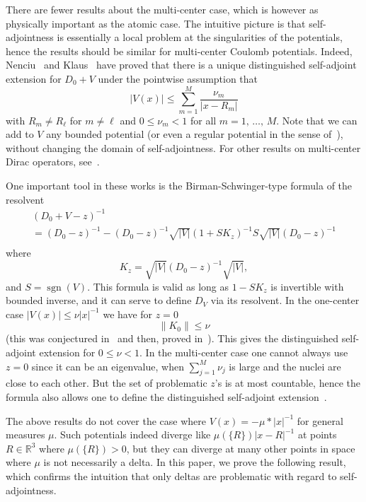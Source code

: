 \documentclass[10pt]{amsart}
\theoremstyle{definition}
\newcommand{\R}{\mathbb{R}}
\DeclareMathOperator{\sgn}{sgn}
\newcommand\1{{\ensuremath {\mathds 1} }}
\newcommand{\norm}[1]{ \left\| #1 \right\|}
\renewcommand{\leq}{\leqslant}
\begin{document}
There are fewer results about the multi-center case, which is however as physically important as the atomic case. The intuitive picture is that self-adjointness is essentially a local problem at the singularities of the potentials, hence the results should be similar for multi-center Coulomb potentials. Indeed, Nenciu~\cite{Nenciu-77} and Klaus~\cite{Klaus-80b} have proved that there is a unique distinguished self-adjoint extension for $D_0+V$ under the pointwise assumption that
\begin{equation}\label{eq:ass_V_subcritical}
\left|V(x)\right|\leq \sum_{m=1}^M\frac{\nu_m}{\left|x-R_m\right|}
\end{equation}
with $R_m\neq R_\ell$ for $m\neq \ell$ and $0\leq \nu_m<1$ for all $m=1,\,\dots,\,M$. Note that we can add to $V$ any bounded potential (or even a regular potential in the sense of~\cite{Nenciu-76,Nenciu-77}), without changing the domain of self-adjointness. For other results on multi-center Dirac operators, see~\cite{BriHog-03,Kanarski-85}.

One important tool in these works is the Birman-Schwinger-type formula of the resolvent~\cite{Klaus-80b,KlaWus-79,Nenciu-76}
\begin{multline}\label{eq:resolvent}
\left(D_0+V-z\right)^{-1}\\
=\left(D_0-z\right)^{-1}-\left(D_0-z\right)^{-1}\sqrt{|V|}\left(1+SK_z\right)^{-1}S\sqrt{|V|}\left(D_0-z\right)^{-1}\\
\end{multline}
where
\begin{equation}\label{eq:def_K}
K_z=\sqrt{|V|}(D_0-z)^{-1}\sqrt{|V|},
\end{equation}
and $S=\sgn(V)$. This formula is valid as long as $1-SK_z$ is invertible with bounded inverse, and it can serve to define $D_V$ via its resolvent. In the one-center case $|V(x)|\leq \nu|x|^{-1}$ we have for $z=0$
\[
\norm{K_0}\leq \nu
\]
(this was conjectured in~\cite{Nenciu-76} and then, proved in~\cite{ArrDuoVeg-13,Kato-83,Wust-77}). This gives the distinguished self-adjoint extension for $0\leq\nu<1$. In the multi-center case one cannot always use $z=0$ since it can be an eigenvalue, when $\sum_{j=1}^M\nu_j$ is large and the nuclei are close to each other. But the set of problematic $z$'s is at most countable, hence the formula also allows one to define the distinguished self-adjoint extension~\cite{Klaus-80b,Nenciu-77}.

The above results do not cover the case where $V(x)=-\mu\ast|x|^{-1}$ for general measures $\mu$. Such potentials indeed diverge like $\mu(\{R\})|x-R|^{-1}$ at points $R\in\R^3$ where $\mu(\{R\})>0$, but they can diverge at many other points in space where $\mu$ is not necessarily a delta. In this paper, we prove the following result, which confirms the intuition that only deltas are problematic with regard to self-adjointness.
\end{document}
